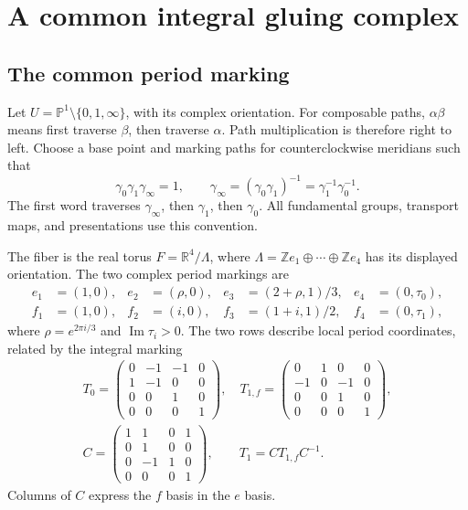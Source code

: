 \section{A common integral gluing complex}\label{sec:common-chain}

\subsection{The common period marking}

Let $U=\mathbb P^1\setminus\{0,1,\infty\}$, with its complex orientation.
For composable paths, $\alpha\beta$ means first traverse $\beta$, then
traverse $\alpha$. Path multiplication is therefore right to left.
Choose a base point and marking paths for counterclockwise meridians
such that
\begin{equation}\label{cc:eq:path-order}
\gamma_0\gamma_1\gamma_\infty=1,
\qquad \gamma_\infty=(\gamma_0\gamma_1)^{-1}
=\gamma_1^{-1}\gamma_0^{-1}.
\end{equation}
The first word traverses $\gamma_\infty$, then $\gamma_1$, then $\gamma_0$.
All fundamental groups, transport maps, and presentations use this convention.

The fiber is the real torus $F=\mathbb R^4/\Lambda$, where
$\Lambda=\mathbb Ze_1\oplus\cdots\oplus\mathbb Ze_4$ has its displayed orientation.
The two complex period markings are
\[
\begin{aligned}
e_1&=(1,0),&e_2&=(\rho,0),&e_3&=(2+\rho,1)/3,&e_4&=(0,\tau_0),\\
f_1&=(1,0),&f_2&=(i,0),&f_3&=(1+i,1)/2,&f_4&=(0,\tau_1),
\end{aligned}
\]
where $\rho=e^{2\pi i/3}$ and $\operatorname{Im}\tau_i>0$.
The two rows describe local period coordinates, related by the integral marking
\begin{equation}\label{cc:eq:matrices}
\begin{gathered}
T_0=\begin{pmatrix}0&-1&-1&0\\1&-1&0&0\\0&0&1&0\\0&0&0&1\end{pmatrix},\quad
T_{1,f}=\begin{pmatrix}0&1&0&0\\-1&0&-1&0\\0&0&1&0\\0&0&0&1\end{pmatrix},\\
C=\begin{pmatrix}1&1&0&1\\0&1&0&0\\0&-1&1&0\\0&0&0&1\end{pmatrix},\qquad
T_1=CT_{1,f}C^{-1}.
\end{gathered}
\end{equation}
Columns of $C$ express the $f$ basis in the $e$ basis.

